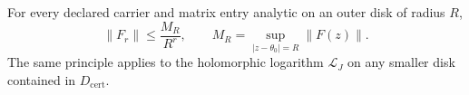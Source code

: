 \begin{corollary}
For every declared carrier and matrix entry analytic on an outer disk of radius $R$,
\begin{equation}
\|F_r\|\le\frac{M_R}{R^r},
\qquad
M_R=\sup_{|z-\theta_0|=R}\|F(z)\|.
\label{eq:cauchybound}
\end{equation}
The same principle applies to the holomorphic logarithm $\mathcal L_J$ on any smaller disk contained in $D_{\mathrm{cert}}$.
\end{corollary}
